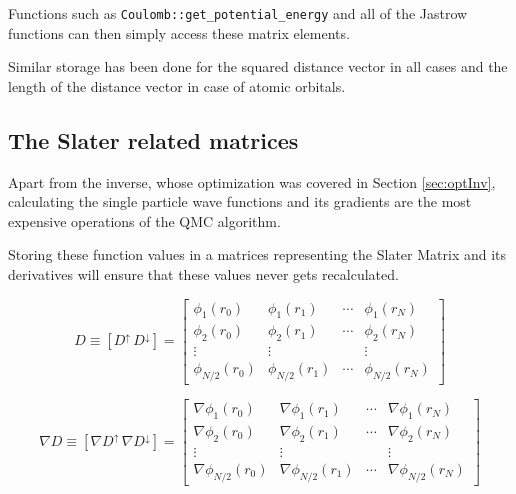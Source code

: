 Functions such as \verb+Coulomb::get_potential_energy+ and all of the Jastrow functions can then simply access these matrix elements.

Similar storage has been done for the squared distance vector in all cases and the length of the distance vector in case of atomic orbitals. 

\subsection{The Slater related matrices}
\label{sec:storeSlater}

Apart from the inverse, whose optimization was covered in Section \ref{sec:optInv}, calculating the single particle wave functions and its gradients are the most expensive operations of the QMC algorithm.

Storing these function values in a matrices representing the Slater Matrix and its derivatives will ensure that these values never gets recalculated. 

\begin{equation}
\label{eq:slaterConcat}
 D  \equiv \left[D^\uparrow\,D^\downarrow\right] = \left[ \begin{array}{cccc}
\phi_1(r_0)     & \phi_1(r_1)     & \cdots & \phi_1(r_N)       \\
\phi_2(r_0)     & \phi_2(r_1)     & \cdots & \phi_2(r_N)       \\
\vdots          & \vdots          &        & \vdots            \\
\phi_{N/2}(r_0) & \phi_{N/2}(r_1) & \cdots & \phi_{N/2}(r_N)   \end{array} \right]
\end{equation}

\begin{equation}
\label{eq:slaterDellConcat}
 \nabla D \equiv \left[\nabla D^\uparrow\,\nabla D^\downarrow\right] =\left[ \begin{array}{cccc}
\nabla \phi_1(r_0)     & \nabla \phi_1(r_1)     & \cdots & \nabla \phi_1(r_N)       \\
\nabla \phi_2(r_0)     & \nabla \phi_2(r_1)     & \cdots & \nabla \phi_2(r_N)       \\
\vdots                 & \vdots                 &        & \vdots                   \\
\nabla \phi_{N/2}(r_0) & \nabla \phi_{N/2}(r_1) & \cdots & \nabla \phi_{N/2}(r_N)   \end{array} \right]
\end{equation}

